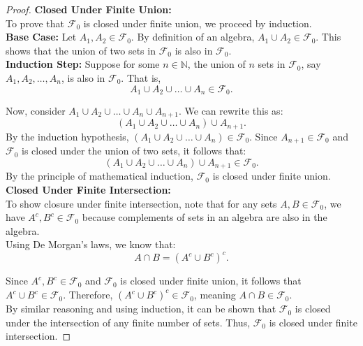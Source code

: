 \begin{proof}

\textbf{Closed Under Finite Union:} \\

To prove that $\mathcal{F}_0$ is closed under finite union, we proceed by induction. \\

\textbf{Base Case:} Let $A_1, A_2 \in \mathcal{F}_0$. By definition of an algebra, $A_1 \cup A_2 \in \mathcal{F}_0$. This shows that the union of two sets in $\mathcal{F}_0$ is also in $\mathcal{F}_0$. \\

\textbf{Induction Step:} Suppose for some $n \in \mathbb{N}$, the union of $n$ sets in $\mathcal{F}_0$, say $A_1, A_2, \ldots, A_n$, is also in $\mathcal{F}_0$. That is,
\[
A_1 \cup A_2 \cup \ldots \cup A_n \in \mathcal{F}_0.
\]

Now, consider $A_1 \cup A_2 \cup \ldots \cup A_n \cup A_{n+1}$. We can rewrite this as:
\[
(A_1 \cup A_2 \cup \ldots \cup A_n) \cup A_{n+1}.
\]
By the induction hypothesis, $(A_1 \cup A_2 \cup \ldots \cup A_n) \in \mathcal{F}_0$. Since $A_{n+1} \in \mathcal{F}_0$ and $\mathcal{F}_0$ is closed under the union of two sets, it follows that:
\[
(A_1 \cup A_2 \cup \ldots \cup A_n) \cup A_{n+1} \in \mathcal{F}_0.
\]
By the principle of mathematical induction, $\mathcal{F}_0$ is closed under finite union. \\

\textbf{Closed Under Finite Intersection:} \\

To show closure under finite intersection, note that for any sets $A, B \in \mathcal{F}_0$, we have $A^c, B^c \in \mathcal{F}_0$ because complements of sets in an algebra are also in the algebra. \\

Using De Morgan's laws, we know that:
\[
A \cap B = (A^c \cup B^c)^c.
\]

Since $A^c, B^c \in \mathcal{F}_0$ and $\mathcal{F}_0$ is closed under finite union, it follows that $A^c \cup B^c \in \mathcal{F}_0$. Therefore, $(A^c \cup B^c)^c \in \mathcal{F}_0$, meaning $A \cap B \in \mathcal{F}_0$. \\

By similar reasoning and using induction, it can be shown that $\mathcal{F}_0$ is closed under the intersection of any finite number of sets. Thus, $\mathcal{F}_0$ is closed under finite intersection.

\end{proof}

